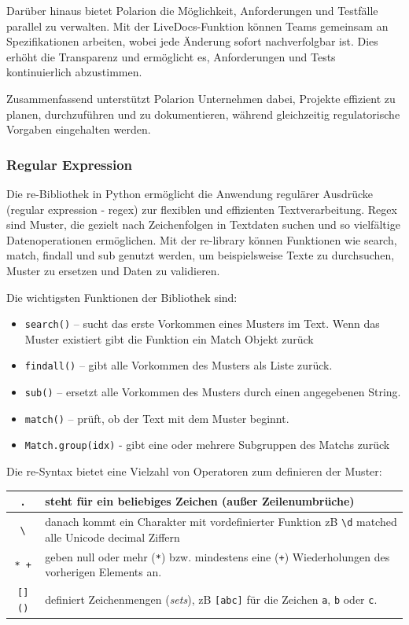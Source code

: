 \documentclass[a4paper, 12pt]{article}
\begin{document}
Darüber hinaus bietet Polarion die Möglichkeit, Anforderungen und Testfälle parallel zu verwalten. Mit der LiveDocs-Funktion können Teams gemeinsam an Spezifikationen arbeiten, wobei jede Änderung sofort nachverfolgbar ist. Dies erhöht die Transparenz und ermöglicht es, Anforderungen und Tests kontinuierlich abzustimmen.

Zusammenfassend unterstützt Polarion Unternehmen dabei, Projekte effizient zu planen, durchzuführen und zu dokumentieren, während gleichzeitig regulatorische Vorgaben eingehalten werden. \cite{polarion_web}


\subsubsection{Regular Expression}\label{regularExpression}
Die re-Bibliothek in Python ermöglicht die Anwendung regulärer Ausdrücke (regular expression - regex) zur flexiblen und effizienten Textverarbeitung. Regex sind Muster, die gezielt nach Zeichenfolgen in Textdaten suchen und so vielfältige Datenoperationen ermöglichen. Mit der re-library können Funktionen wie search, match, findall und sub genutzt werden, um beispielsweise Texte zu durchsuchen, Muster zu ersetzen und Daten zu validieren. \cite{regex_lib}

Die wichtigsten Funktionen der Bibliothek sind:
\begin{itemize}
    \item \texttt{search()} – sucht das erste Vorkommen eines Musters im Text. Wenn das Muster existiert gibt die Funktion ein Match Objekt zurück
    \item \texttt{findall()} – gibt alle Vorkommen des Musters als Liste zurück.
    \item \texttt{sub()} – ersetzt alle Vorkommen des Musters durch einen angegebenen String.
    \item \texttt{match()} – prüft, ob der Text mit dem Muster beginnt.
    	\item \texttt{Match.group(idx)} - gibt eine oder mehrere Subgruppen des Matchs zurück
\end{itemize}

\newpage
Die re-Syntax bietet eine Vielzahl von Operatoren zum definieren der Muster:
\begin{table}[h!]
\centering
\begin{tabular}{|c | >{\arraybackslash}p{11cm}|}
\hline
\texttt{.} & steht für ein beliebiges Zeichen (außer Zeilenumbrüche) \\
\hline
\texttt{\textbackslash} & danach kommt ein Charakter mit vordefinierter Funktion zB \texttt{\textbackslash d}  matched
	alle Unicode decimal Ziffern \\
\hline
\texttt{* +} & geben null oder mehr (\texttt{*}) bzw. mindestens 
	eine (\texttt{+}) Wiederholungen des vorherigen Elements an. \\
\hline
\texttt{[] ()} & definiert Zeichenmengen (\textit{sets}), zB \texttt{[abc]} für die Zeichen 	 
	\texttt{a}, \texttt{b} oder \texttt{c}. \\
\hline
\end{tabular}
\end{table}
\end{document}
